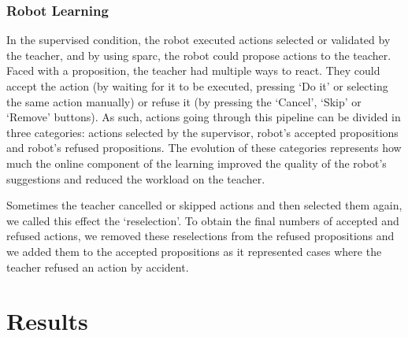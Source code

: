 
\subsubsection{Robot Learning}

In the supervised condition, the robot executed actions selected or validated by the teacher, and by using \gls{sparc}, the robot could propose actions to the teacher. Faced with a proposition, the teacher had multiple ways to react. They could accept the action (by waiting for it to be executed, pressing `Do it' or selecting the same action manually) or refuse it (by pressing the `Cancel', `Skip' or `Remove' buttons). As such, actions going through this pipeline can be divided in three categories: actions selected by the supervisor, robot's accepted propositions and robot's refused propositions. The evolution of these categories represents how much the online component of the learning improved the quality of the robot's suggestions and reduced the workload on the teacher. 

Sometimes the teacher cancelled or skipped actions and then selected them again, we called this effect the `reselection'. To obtain the final numbers of accepted and refused actions, we removed these reselections from the refused propositions and we added them to the accepted propositions as it represented cases where the teacher refused an action by accident.

\section{Results}



